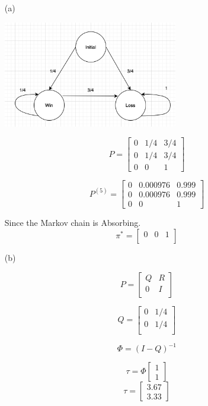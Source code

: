 \documentclass[unicode,11pt,a4paper,oneside,numbers=endperiod,openany]{scrartcl}
\begin{document}
\begin{itemize}
	\item [(a)] 
	\begin{flushleft}
    \includegraphics[width=0.60\textwidth]{markov1.png}
    \end{flushleft}
     \[ P = 
        \begin{bmatrix}
                0 & 1/4 & 3/4\\
                0 & 1/4 & 3/4\\
                0 & 0 & 1
        \end{bmatrix}
    \]
    
     \[ P^{(5)} = 
        \begin{bmatrix}
                0 & 0.000976 & 0.999\\
                0 & 0.000976 & 0.999\\
                0 & 0 & 1
        \end{bmatrix}
    \]
    
    {Since the Markov chain is Absorbing.}
    \[ \pi^* = 
		\begin{bmatrix}
                0 & 0 & 1\\
        \end{bmatrix}
   \]
    
	\item [(b)] 
	
	\[ P = 
		\begin{bmatrix}
                Q & R\\
                0 & I\\
        \end{bmatrix}
   \]
	
	\[ Q = 
        \begin{bmatrix}
                0 & 1/4\\
                0 & 1/4\\
        \end{bmatrix}
    \]
    
    \[ \Phi = (I - Q)^{-1}
   \]
   
   
   \[ \tau = \Phi
        \begin{bmatrix}
                1\\
                1
        \end{bmatrix}
   \]
   \[ \tau =
        \begin{bmatrix}
                3.67\\
                3.33
        \end{bmatrix}
   \]
    
    
	
\end{itemize}


\end{document}
